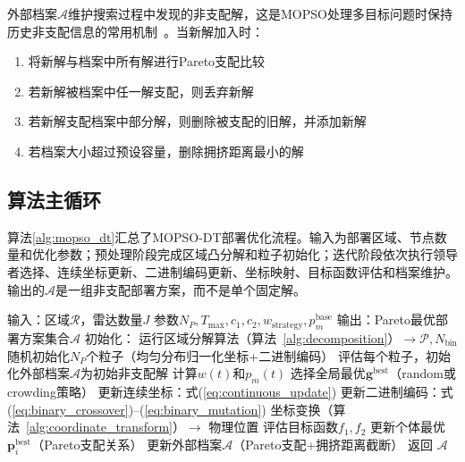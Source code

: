 外部档案$\mathcal{A}$维护搜索过程中发现的非支配解，这是MOPSO处理多目标问题时保持历史非支配信息的常用机制~\cite{Coello2004,Mostaghim2003}。当新解加入时：
\begin{enumerate}
    \item 将新解与档案中所有解进行Pareto支配比较
    \item 若新解被档案中任一解支配，则丢弃新解
    \item 若新解支配档案中部分解，则删除被支配的旧解，并添加新解
    \item 若档案大小超过预设容量，删除拥挤距离最小的解
\end{enumerate}

\subsection{算法主循环}

算法\ref{alg:mopso_dt}汇总了MOPSO-DT部署优化流程。输入为部署区域、节点数量和优化参数；预处理阶段完成区域凸分解和粒子初始化；迭代阶段依次执行领导者选择、连续坐标更新、二进制编码更新、坐标映射、目标函数评估和档案维护。输出的$\mathcal{A}$是一组非支配部署方案，而不是单个固定解。

\Needspace{0.48\textheight}
\begin{algorithm}
\caption{MOPSO-DT多目标部署优化}
\label{alg:mopso_dt}
\begin{algorithmic}[1]
\STATE 输入：区域$\mathcal{R}$，雷达数量$J$
\STATE \quad 参数$N_P, T_{\max}, c_1, c_2, w_{\text{strategy}}, p_m^{\text{base}}$
\STATE 输出：Pareto最优部署方案集合$\mathcal{A}$
\STATE 初始化：
\STATE \quad 运行区域分解算法（算法~\ref{alg:decomposition}）$\to \mathcal{P}, N_{\text{bin}}$
\STATE \quad 随机初始化$N_P$个粒子（均匀分布归一化坐标+二进制编码）
\STATE \quad 评估每个粒子，初始化外部档案$\mathcal{A}$为初始非支配解
    \STATE 计算$w(t)$和$p_m(t)$
        \STATE 选择全局最优$\mathbf{g}^{\text{best}}$（random或crowding策略）
        \STATE 更新连续坐标：式(\ref{eq:continuous_update})
        \STATE 更新二进制编码：式(\ref{eq:binary_crossover})--(\ref{eq:binary_mutation})
        \STATE 坐标变换（算法~\ref{alg:coordinate_transform}）$\to$ 物理位置
        \STATE 评估目标函数$f_1, f_2$
        \STATE 更新个体最优$\mathbf{p}_i^{\text{best}}$（Pareto支配关系）
    \ENDFOR
    \STATE 更新外部档案$\mathcal{A}$（Pareto支配+拥挤距离截断）
\ENDFOR
\STATE 返回 $\mathcal{A}$
\end{algorithmic}
\end{algorithm}

